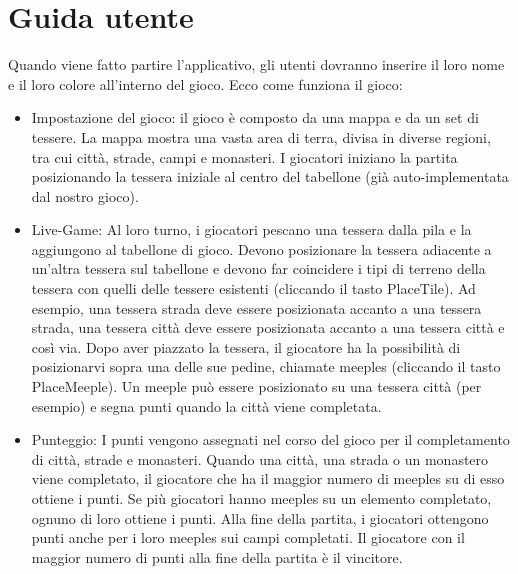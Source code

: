 \section{Guida utente}
Quando viene fatto partire l'applicativo, gli utenti dovranno inserire il loro nome e il loro colore all'interno del gioco. Ecco come funziona il gioco: 
\begin{itemize}
    \item Impostazione del gioco: il gioco è composto da una mappa e da un set di tessere. La mappa mostra una vasta area di terra, divisa in diverse regioni, tra cui città, strade, campi e monasteri. I giocatori iniziano la partita posizionando la tessera iniziale al centro del tabellone (già auto-implementata dal nostro gioco).
    \item Live-Game: Al loro turno, i giocatori pescano una tessera dalla pila e la aggiungono al tabellone di gioco. Devono posizionare la tessera adiacente a un'altra tessera sul tabellone e devono far coincidere i tipi di terreno della tessera con quelli delle tessere esistenti (cliccando il tasto PlaceTile). Ad esempio, una tessera strada deve essere posizionata accanto a una tessera strada, una tessera città deve essere posizionata accanto a una tessera città e così via. Dopo aver piazzato la tessera, il giocatore ha la possibilità di posizionarvi sopra una delle sue pedine, chiamate meeples (cliccando il tasto PlaceMeeple). Un meeple può essere posizionato su una tessera città (per esempio) e segna punti quando la città viene completata. 
    \item Punteggio: I punti vengono assegnati nel corso del gioco per il completamento di città, strade e monasteri. Quando una città, una strada o un monastero viene completato, il giocatore che ha il maggior numero di meeples su di esso ottiene i punti. Se più giocatori hanno meeples su un elemento completato, ognuno di loro ottiene i punti. Alla fine della partita, i giocatori ottengono punti anche per i loro meeples sui campi completati. Il giocatore con il maggior numero di punti alla fine della partita è il vincitore.
\end{itemize}